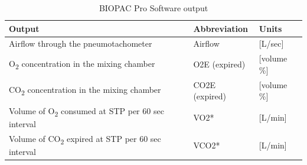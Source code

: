 \documentclass{article}
\begin{document}
\begin{table}[h]
	\centering
	\caption{BIOPAC Pro Software output}
	\begin{tabular}[h!]{p{}|p{}|p{}}
	\toprule
	Output & Abbreviation & Units\\
	\midrule
	Airflow through the pneumotachometer & Airflow & [L/sec]\\
	O\textsubscript{2} concentration in the mixing chamber & O2E (expired) & [volume \%]\\
	CO\textsubscript{2} concentration in the mixing chamber & CO2E (expired) & [volume \%]\\
	Volume of O\textsubscript{2} consumed at STP per 60 sec interval & VO2* & [L/min]\\
	Volume of CO\textsubscript{2} expired at STP per 60 sec interval & VCO2* & [L/min]\\
	\bottomrule
	\end{tabular}
	\label{abbreviation}
	\end{table}
\end{document}
